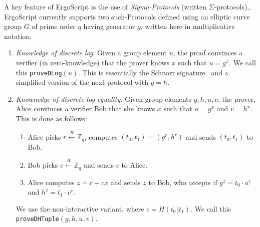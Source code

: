 \documentclass[11pt]{article}
\newcommand{\langname}{ErgoScript\xspace}
\begin{document}
A key feature of \langname is the use of {\em Sigma-Protocols} (written $\Sigma$-protocols)\cite{Dam10},\cite[Chapter 6]{HL10}. \langname currently supports two such-Protocols defined using an elliptic curve group $G$ of prime order $q$ having generator $g$, written here in multiplicative notation:

\begin{enumerate}
	\item {\em Knowledge of discrete log}: Given a group element $u$, the proof convinces a verifier (in zero-knowledge) that the prover knows $x$ such that $u=g^x$. We call this \texttt{proveDLog}$(u)$. This is essentially the Schnorr signature~\cite{Sch91} and a simplified version of the next protocol with $g = h$.%
	
	\item {\em Knownedge of discrete log equality:} Given group elements $g, h, u, v$, the prover, Alice convinces a verifier Bob that she knows $x$ such that $u={g}^x$ and $v={h}^x$. This is done as follows: 
	\begin{enumerate}
		\item Alice picks $r \stackrel{R}{\leftarrow} \mathbb{Z}_q$, computes $(t_0, t_1) = ({g}^r, {h}^r)$ and sends $(t_0, t_1)$ to Bob.
		\item Bob picks $c \stackrel{R}{\leftarrow} \mathbb{Z}_q$ and sends $c$ to Alice.
		\item Alice computes $z = r + cx$ and sends $z$ to Bob, who accepts if ${g}^z = {t_0}\cdot {u}^c$ and $h^z=t_1\cdot v^c$. %
	\end{enumerate}
	
	We use the non-interactive variant, where $c = H(t_0 \Vert t_1)$. We call this \texttt{proveDHTuple}$(g, h, u, v)$.
	
\end{enumerate}

\end{document}
